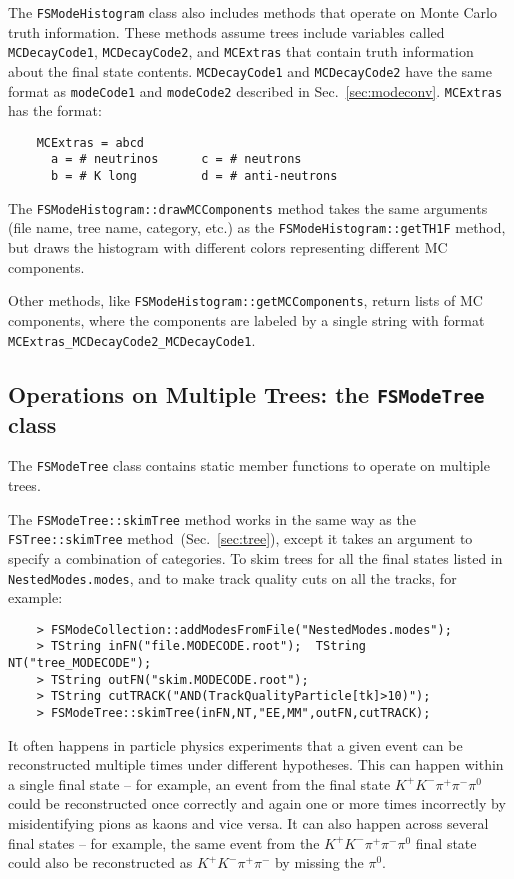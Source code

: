 \documentclass[11pt]{article}
\begin{document}
The {\tt FSModeHistogram} class also includes methods that operate on Monte Carlo truth information.  These methods assume trees include variables called {\tt MCDecayCode1}, {\tt MCDecayCode2}, and {\tt MCExtras} that contain truth information about the final state contents.  {\tt MCDecayCode1} and {\tt MCDecayCode2} have the same format as {\tt modeCode1} and {\tt modeCode2} described in Sec.~\ref{sec:modeconv}. {\tt MCExtras} has the format:
\begin{verbatim}
    MCExtras = abcd
      a = # neutrinos      c = # neutrons    
      b = # K long         d = # anti-neutrons
\end{verbatim}

The {\tt FSModeHistogram::drawMCComponents} method takes the same arguments (file name, tree name, category, etc.) as the {\tt FSModeHistogram::getTH1F} method, but draws the histogram with different colors representing different MC components.  

Other methods, like {\tt FSModeHistogram::getMCComponents}, return lists of MC components, where the components are labeled by a single string with format {\tt  MCExtras\_MCDecayCode2\_MCDecayCode1}.

\subsection{Operations on Multiple Trees: the {\tt FSModeTree} class}
\label{sec:modetree}

The {\tt FSModeTree} class contains static member functions to operate on multiple trees.

The {\tt FSModeTree::skimTree} method works in the same way as the {\tt FSTree::skimTree} method~(Sec.~\ref{sec:tree}), except it takes an argument to specify a combination of categories.  To skim trees for all the final states listed in {\tt NestedModes.modes}, and to make track quality cuts on all the tracks, for example:
\begin{verbatim}
    > FSModeCollection::addModesFromFile("NestedModes.modes");
    > TString inFN("file.MODECODE.root");  TString NT("tree_MODECODE");
    > TString outFN("skim.MODECODE.root");
    > TString cutTRACK("AND(TrackQualityParticle[tk]>10)");
    > FSModeTree::skimTree(inFN,NT,"EE,MM",outFN,cutTRACK);
\end{verbatim}

It often happens in particle physics experiments that a given event can be reconstructed multiple times under different hypotheses.  This can happen within a single final state -- for example, an event from the final state $K^+K^-\pi^+\pi^-\pi^0$ could be reconstructed once correctly and again one or more times incorrectly by misidentifying pions as kaons and vice versa.  It can also happen across several final states -- for example, the same event from the $K^+K^-\pi^+\pi^-\pi^0$ final state could also be reconstructed as $K^+K^-\pi^+\pi^-$ by missing the $\pi^0$.  
\end{document}

